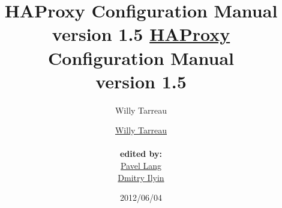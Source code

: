 \title{HAProxy Configuration Manual version 1.5}
\author{Willy Tarreau}
\date{2012/06/04}

\usepackage[linktoc=all,unicode]{hyperref}

\title{
\Huge
\bfseries
\href{http://haproxy.1wt.eu/}{HAProxy} \\
Configuration Manual \\
version 1.5
}

\author{
\LARGE
\href{mailto:w@1wt.eu}{Willy Tarreau}\\
\\
\Large
\textbf{edited by:} \\
\href{mailto:langpavel@phpskelet.org}{Pavel Lang} \\
\href{mailto:idv1985@gmail.com}{Dmitry Ilyin}
}